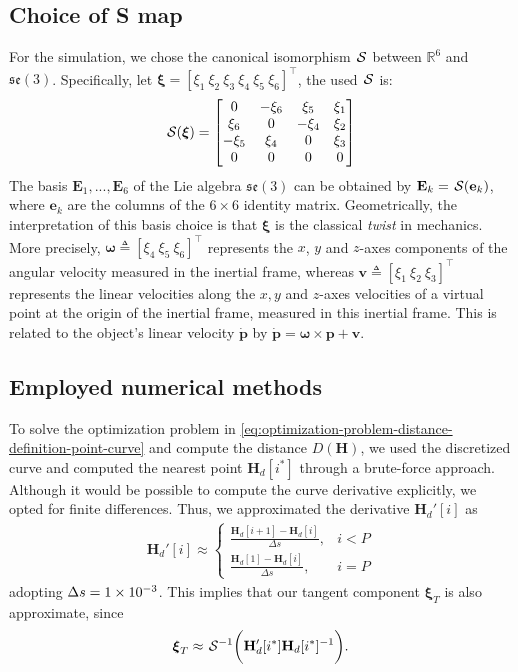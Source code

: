 \subsection{Choice of S map}
For the simulation, we chose the canonical isomorphism $\SL$ between $\mathbb{R}^6$ and $\mathfrak{se}(3)$. Specifically, let $\boldsymbol{\xi} = [\xi_1 \ \xi_2 \ \xi_3 \ \xi_4 \ \xi_5 \ \xi_6]^\top$, the used $\SL$ is:
\begin{align}
    \SL[\boldsymbol{\xi}] = \begin{bmatrix}
    0 & -\xi_6 & \xi_5 & \xi_1 \\
    \xi_6 & 0 & -\xi_4 & \xi_2 \\
    -\xi_5 & \xi_4 & 0 & \xi_3 \\
    0 & 0 & 0 & 0
    \end{bmatrix}
\end{align}
The basis $\mathbf{E}_1, ... ,\mathbf{E}_6$ of the Lie algebra $\mathfrak{se}(3)$ can be obtained by $\mathbf{E}_k = \SL[\mathbf{e}_k]$, where $\mathbf{e}_k$ are the columns of the $6 \times 6$ identity matrix. Geometrically, the interpretation of this basis choice is that $\boldsymbol{\xi}$ is the classical \emph{twist} in mechanics. More precisely, $\boldsymbol{\omega} \triangleq [\xi_4 \  \xi_5 \  \xi_6]^\top$ represents the $x$, $y$ and $z$-axes components of the angular  velocity  measured in the inertial frame, whereas $\mathbf{v} \triangleq [\xi_1 \  \xi_2 \  \xi_3]^\top$ represents the linear velocities along the $x, y$ and $z$-axes velocities of a virtual point at the origin of the inertial frame, measured in this inertial frame. This is related to the object's linear velocity $\dot{\mathbf{p}}$  by $\dot{\mathbf{p}} = \boldsymbol{\omega} \times \mathbf{p} + \mathbf{v}$.

\subsection{Employed numerical methods}
To solve the optimization problem in \eqref{eq:optimization-problem-distance-definition-point-curve} and compute the distance $D(\mathbf{H})$, we used the discretized curve and computed the nearest point $\mathbf{H}_d[i^*]$ through a brute-force approach. Although it would be possible to compute the curve derivative explicitly, we opted for finite differences. Thus, we approximated the derivative $\mathbf{H}_d'[i]$ as
\begin{align}
    \mathbf{H}_d'[i] \approx \begin{cases}
        \frac{\mathbf{H}_d[i+1] - \mathbf{H}_d[i]}{\Delta s}, &  i < P\\    
        \frac{\mathbf{H}_d[1] - \mathbf{H}_d[i]}{\Delta s}, &  i = P
    \end{cases}
\end{align}
adopting $\Delta s = \num{1E-3}$. This implies that our tangent component $\boldsymbol{\xi}_T$ is also approximate, since
\begin{align}
    \boldsymbol{\xi}_T \approx \invSL\biggl(\mathbf{H}_d'[i^*]\mathbf{H}_d[i^*]^{-1}\biggr).
\end{align}

